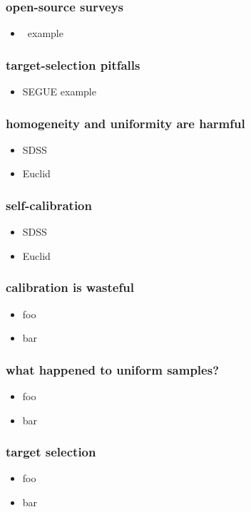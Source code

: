 \documentclass[pdftex]{beamer}
\begin{document}
\begin{frame}
  \frametitle{open-source surveys}
  \begin{itemize}
  \item \hipparcos\ example
  \end{itemize}
\end{frame}

\begin{frame}
  \frametitle{target-selection pitfalls}
  \begin{itemize}
  \item SEGUE example
  \end{itemize}
\end{frame}

\begin{frame}
  \frametitle{homogeneity and uniformity are harmful}
  \begin{itemize}
  \item SDSS
  \item Euclid
  \end{itemize}
\end{frame}

\begin{frame}
  \frametitle{self-calibration}
  \begin{itemize}
  \item SDSS
  \item Euclid
  \end{itemize}
\end{frame}

\begin{frame}
  \frametitle{calibration is wasteful}
  \begin{itemize}
  \item foo
  \item bar
  \end{itemize}
\end{frame}

\begin{frame}
  \frametitle{what happened to uniform samples?}
  \begin{itemize}
  \item foo
  \item bar
  \end{itemize}
\end{frame}

\begin{frame}
  \frametitle{target selection}
  \begin{itemize}
  \item foo
  \item bar
  \end{itemize}
\end{frame}
\end{document}
